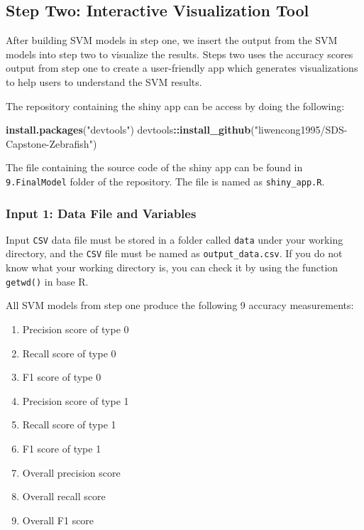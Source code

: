 \documentclass[10pt,letterpaper]{article}
\newenvironment{Shaded}{\begin{snugshade}}{\end{snugshade}}
\newcommand{\KeywordTok}[1]{\textcolor[rgb]{0.13,0.29,0.53}{\textbf{#1}}}
\newcommand{\StringTok}[1]{\textcolor[rgb]{0.31,0.60,0.02}{#1}}
\newcommand{\OperatorTok}[1]{\textcolor[rgb]{0.81,0.36,0.00}{\textbf{#1}}}
\newcommand{\NormalTok}[1]{#1}
\providecommand{\tightlist}{%
  \setlength{\itemsep}{0pt}\setlength{\parskip}{0pt}}
\begin{document}
\subsection{Step Two: Interactive Visualization
Tool}\label{step-two-interactive-visualization-tool}

After building SVM models in step one, we insert the output from the SVM
models into step two to visualize the results. Steps two uses the
accuracy scores output from step one to create a user-friendly app which
generates visualizations to help users to understand the SVM results.

The repository containing the shiny app can be access by doing the
following:

\begin{Shaded}
\begin{Highlighting}[]
\KeywordTok{install.packages}\NormalTok{(}\StringTok{"devtools"}\NormalTok{)}
\NormalTok{devtools}\OperatorTok{::}\KeywordTok{install_github}\NormalTok{(}\StringTok{"liwencong1995/SDS-Capstone-Zebrafish"}\NormalTok{)}
\end{Highlighting}
\end{Shaded}

The file containing the source code of the shiny app can be found in
\texttt{9.FinalModel} folder of the repository. The file is named as
\texttt{shiny\_app.R}.

\subsubsection{Input 1: Data File and
Variables}\label{input-1-data-file-and-variables}

Input \texttt{CSV} data file must be stored in a folder called
\texttt{data} under your working directory, and the \texttt{CSV} file
must be named as \texttt{output\_data.csv}. If you do not know what your
working directory is, you can check it by using the function
\texttt{getwd()} in base R.

All SVM models from step one produce the following 9 accuracy
measurements:

\begin{enumerate}
\def\labelenumi{\arabic{enumi}.}
\tightlist
\item
  Precision score of type 0
\item
  Recall score of type 0
\item
  F1 score of type 0
\item
  Precision score of type 1
\item
  Recall score of type 1
\item
  F1 score of type 1
\item
  Overall precision score
\item
  Overall recall score
\item
  Overall F1 score
\end{enumerate}
\end{document}
